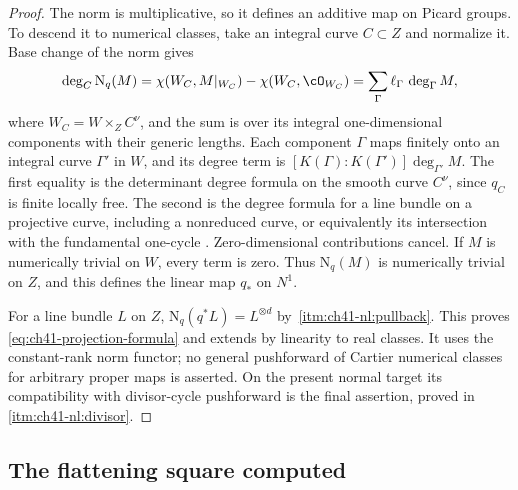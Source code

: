 \begin{proof}
The norm is multiplicative, so it defines an additive map on Picard
groups.  To descend it to numerical classes, take an integral curve
$C\subset Z$ and normalize it.  Base change of the norm gives
\[
 \deg_C\mathrm N_q(M)
 =\chi(W_C,M|_{W_C})-\chi(W_C,\cO_{W_C})
 =\sum_\Gamma \ell_\Gamma\,\deg_\Gamma M,
\]
where $W_C=W\times_Z C^\nu$, and the sum is over its integral
one-dimensional components with their generic lengths.  Each
component $\Gamma$ maps finitely onto an integral curve $\Gamma'$
in $W$, and its degree term is
$[K(\Gamma):K(\Gamma')]\deg_{\Gamma'}M$.
The first equality is the determinant degree formula on the smooth
curve $C^\nu$, since $q_C$ is finite locally free.  The second is the
degree formula for a line bundle on a projective curve, including a
nonreduced curve, or equivalently its intersection with the fundamental
one-cycle \cite{Ful}.  Zero-dimensional contributions cancel.
If $M$ is numerically trivial on $W$, every term is zero.
Thus $\mathrm N_q(M)$ is numerically trivial on $Z$, and this
defines the linear map $q_*$ on $N^1$.

For a line bundle $L$ on $Z$,
$\mathrm N_q(q^*L)=L^{\otimes d}$ by
\,\cref{itm:ch41-nl:pullback}.
This proves \eqref{eq:ch41-projection-formula} and extends by
linearity to real classes.  It uses the constant-rank norm functor;
no general pushforward of Cartier numerical classes for arbitrary
proper maps is asserted.  On the present normal target its compatibility
with divisor-cycle pushforward is the final assertion, proved in
\,\cref{itm:ch41-nl:divisor}.
\end{proof}

\subsection{The flattening square computed}
\label{sec:ch41-flatten-example}

